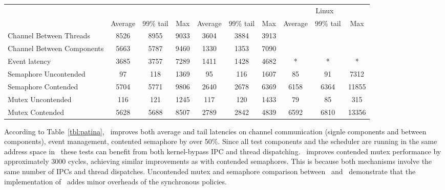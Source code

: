 \begin{table*}[h]
    \centering
	\begin{tabular}{l|c|c|c|c|c|c|c|c|c} \hline
		& \multicolumn{3}{c|}{\cos} & \multicolumn{3}{c|}{\name} & \multicolumn{3}{c}{Linux}\\
			  & Average & 99\% tail & Max & Average & 99\% tail & Max & Average & 99\% tail & Max\\ \hline
		Channel Between Threads & 8526 & 8955 & 9033 & 3604 & 3884 & 3913 & & & \\
		Channel Between Components & 5663 & 5787 & 9460 & 1330 & 1353 & 7090 &  & & \\ \hline
		Event latency & 3685 & 3757 & 7289 & 1411 & 1428 & 4682 & {*} & {*} & {*} \\ \hline
		Semaphore Uncontended & 97 & 118 & 1369 & 95 & 116 & 1607 & 85 & 91 & 7312 \\
		Semaphore Contended & 5704 & 5771 & 9806 & 2640 & 2678 & 6369 & 6158 & 6364 & 11855 \\ \hline
		Mutex Uncontended & 116 & 121 & 1245 & 117 & 120 & 1433 & 79 & 85 & 315 \\
		Mutex Contended & 5628 & 5688 & 8507 & 2789 & 2842 & 4839 & 6592 & 6810 & 13356 \\ \hline
        \end{tabular}
	\caption{\small Patina overheads in Cycles in \name\ and \cos .}
    \label{tbl:patina}
\end{table*}

According to Table~\ref{tbl:patina}, \name\ improves both average and tail latencies on channel communication (signle components and between components), event management, contented semaphore by over 50\%.
Since all test components and the scheduler are running in the same address space in \name\, these tests can benefit from both kernel-bypass IPC and thread dispatching.
\name\ improves contended mutex performance by approximately 3000 cycles, achieving similar improvements as with contended semaphores.
This is because both mechanisms involve the same number of IPCs and thread dispatches.
Uncontended mutex and semaphore comparison between \name\ and \cos\ demonstrate that the implementation of \name\ addes minor overheads of the synchronous policies.


